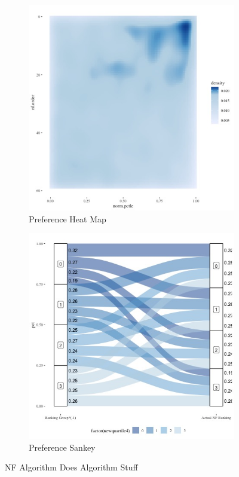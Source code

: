\documentclass[12pt,letterpaper]{article}
\begin{document}
\begin{figure}[ht]
   \begin{subfigure}{.5\textwidth} 
        \centering
        \includegraphics[width=1\linewidth]{Output/Graphs/Audit/Heatmaps/US NF norm pref rank by nf rank - smooth.jpg}  
        \caption{Preference Heat Map}
        \label{fig:sub-first}
        \end{subfigure}
    \begin{subfigure}{.5\textwidth}
        \centering
        \includegraphics[width=1\linewidth]{Output/Graphs/Audit/Sankey flows/US NF norm quartile to actual.jpg}  
        \caption{Preference Sankey}
        \label{fig:sub-second}
    \end{subfigure}
    
\caption{NF Algorithm Does Algorithm Stuff}
\end{figure}
\end{document}
